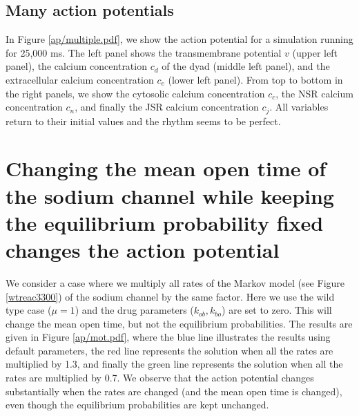 

\subsection{Many action potentials}

In Figure \ref{ap/multiple.pdf}, we show the action potential for a simulation running for 25,000 ms. The left panel shows the transmembrane potential $v$ (upper left panel), the calcium concentration $c_d$ of the dyad (middle left panel), and the extracellular calcium concentration $c_e$ (lower left panel). From top to bottom in the right panels, we show the cytosolic calcium concentration $c_c$, the NSR calcium concentration $c_n$, and finally the JSR calcium concentration $c_j$. All variables return to their initial values and the rhythm seems to be perfect. 


\section[Changing the mean open time]{Changing the mean open time of the sodium channel while keeping the equilibrium probability fixed changes the action potential \label{sec:ap_mot}}

We consider a case where we multiply all rates of the Markov model (see Figure \ref{wtreac3300}) of the sodium channel by the same factor. Here we use the wild type case ($\mu=1$) and the drug parameters ($k_{ob}, k_{bo}$) are set to zero. This will change the mean open time, but not the equilibrium probabilities. The results are given in Figure \ref{ap/mot.pdf}, where the blue line illustrates the results using default parameters, the red line represents the solution when all the rates are multiplied by 1.3, and finally the green line represents the solution when all the rates are multiplied by 0.7. We observe that the action potential changes substantially when the rates are changed (and the mean open time is changed), even though the equilibrium probabilities are kept unchanged.


